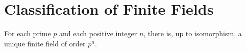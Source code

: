 \section{Classification of Finite Fields}

\begin{theorem}
	For each prime $p$ and each positive integer $n$, there is, up to isomorphism, a unique finite field of order $p^n$.
\end{theorem}

